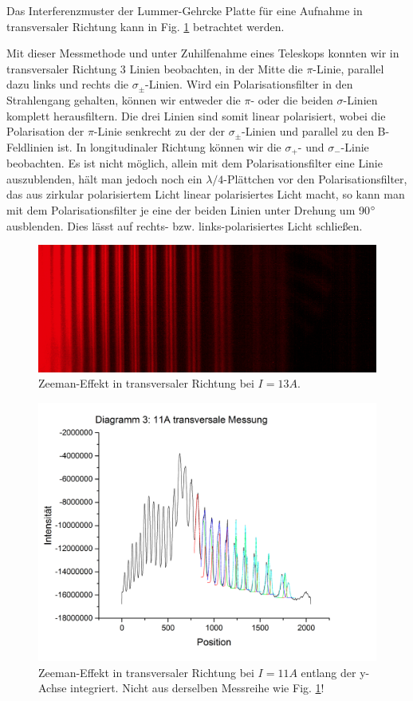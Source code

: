 Das Interferenzmuster der Lummer-Gehrcke Platte für eine Aufnahme in transversaler Richtung kann in Fig. \ref{fig:Interferenz} betrachtet werden.

Mit dieser Messmethode und unter Zuhilfenahme eines Teleskops konnten wir in transversaler Richtung 3 Linien beobachten, in der Mitte die $\pi$-Linie, parallel dazu links und rechts die $\sigma_{\pm}$-Linien. Wird ein Polarisationsfilter in den Strahlengang gehalten, können wir entweder die $\pi$- oder die beiden $\sigma$-Linien komplett herausfiltern. Die drei Linien sind somit linear polarisiert, wobei die Polarisation der $\pi$-Linie senkrecht zu der der $\sigma_{\pm}$-Linien und parallel zu den B-Feldlinien ist.
In longitudinaler Richtung können wir die $\sigma_+$- und $\sigma_-$-Linie beobachten. Es ist nicht möglich, allein mit dem Polarisationsfilter eine Linie auszublenden, hält man jedoch noch ein $\lambda/4$-Plättchen vor den Polarisationsfilter, das aus zirkular polarisiertem Licht linear polarisiertes Licht macht, so kann man mit dem Polarisationsfilter je eine der beiden Linien unter Drehung um 90$\degree$ ausblenden. Dies lässt auf rechts- bzw. links-polarisiertes Licht schließen.

\begin{figure}
  \includegraphics[width=\linewidth]{images/Transversal.png}
  \caption{Zeeman-Effekt in transversaler Richtung bei $I = 13 A$.}
  \label{fig:Interferenz}
\end{figure}

\begin{figure}
  \includegraphics[width=\linewidth]{images/11AMessung.png}
  \caption{Zeeman-Effekt in transversaler Richtung bei $I = 11 A$ entlang der y-Achse integriert. Nicht aus derselben Messreihe wie Fig. \ref{fig:Interferenz}!}
  \label{fig:Gaussfits}
\end{figure}

